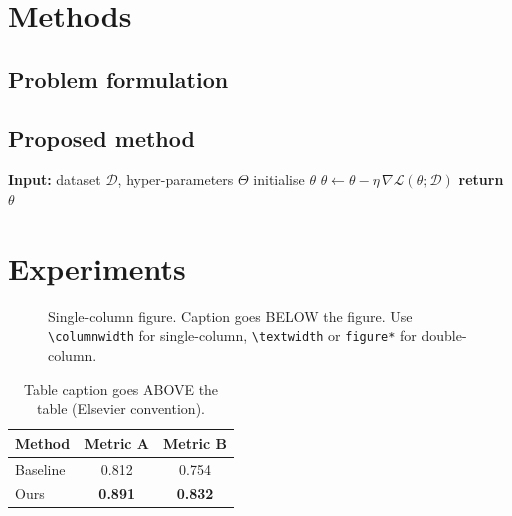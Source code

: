 \documentclass[3p,times]{elsarticle}
\begin{document}
\section{Methods}
\label{sec:methods}

\subsection{Problem formulation}

\subsection{Proposed method}

\begin{algorithm}[t]
\caption{Outline of the proposed method}
\label{alg:method}
\begin{algorithmic}[1]
\STATE \textbf{Input:} dataset $\mathcal{D}$, hyper-parameters $\Theta$
\STATE initialise $\theta$
    \STATE $\theta \leftarrow \theta - \eta\,\nabla\mathcal{L}(\theta;\mathcal{D})$
\ENDWHILE
\STATE \textbf{return} $\theta$
\end{algorithmic}
\end{algorithm}

\section{Experiments}
\label{sec:experiments}

\begin{figure}[t]
\centering
\fbox{\rule{0pt}{4cm}\rule{\columnwidth}{0pt}}
\caption{Single-column figure. Caption goes BELOW the figure. Use
\texttt{\textbackslash columnwidth} for single-column, \texttt{\textbackslash textwidth}
or \texttt{figure*} for double-column.}
\label{fig:result}
\end{figure}

\begin{table}[t]
\caption{Table caption goes ABOVE the table (Elsevier convention).}
\label{tab:results}
\centering
\begin{tabular}{lcc}
\toprule
Method   & Metric A       & Metric B       \\
\midrule
Baseline & 0.812          & 0.754          \\
Ours     & \textbf{0.891} & \textbf{0.832} \\
\bottomrule
\end{tabular}
\end{table}
\end{document}
